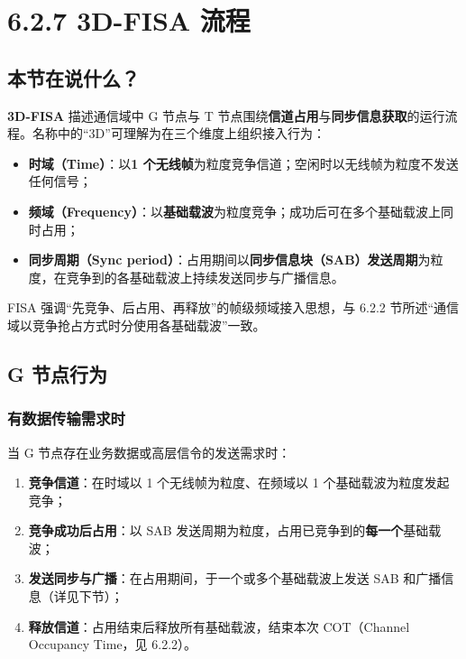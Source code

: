 \documentclass[11pt,a4paper]{ctexart}
\begin{document}
\section{6.2.7 3D-FISA 流程}

\subsection{本节在说什么？}

\textbf{3D-FISA} 描述通信域中 G 节点与 T 节点围绕\textbf{信道占用}与\textbf{同步信息获取}的运行流程。名称中的“3D”可理解为在三个维度上组织接入行为：

\begin{itemize}
  \item \textbf{时域（Time）}：以\textbf{1 个无线帧}为粒度竞争信道；空闲时以无线帧为粒度不发送任何信号；
  \item \textbf{频域（Frequency）}：以\textbf{基础载波}为粒度竞争；成功后可在多个基础载波上同时占用；
  \item \textbf{同步周期（Sync period）}：占用期间以\textbf{同步信息块（SAB）发送周期}为粒度，在竞争到的各基础载波上持续发送同步与广播信息。
\end{itemize}

FISA 强调“先竞争、后占用、再释放”的帧级频域接入思想，与 6.2.2 节所述“通信域以竞争抢占方式时分使用各基础载波”一致。

\subsection{G 节点行为}

\subsubsection{有数据传输需求时}

当 G 节点存在业务数据或高层信令的发送需求时：

\begin{enumerate}
  \item \textbf{竞争信道}：在时域以 1 个无线帧为粒度、在频域以 1 个基础载波为粒度发起竞争；
  \item \textbf{竞争成功后占用}：以 SAB 发送周期为粒度，占用已竞争到的\textbf{每一个}基础载波；
  \item \textbf{发送同步与广播}：在占用期间，于一个或多个基础载波上发送 SAB 和广播信息（详见下节）；
  \item \textbf{释放信道}：占用结束后释放所有基础载波，结束本次 COT（Channel Occupancy Time，见 6.2.2）。
\end{enumerate}
\end{document}
